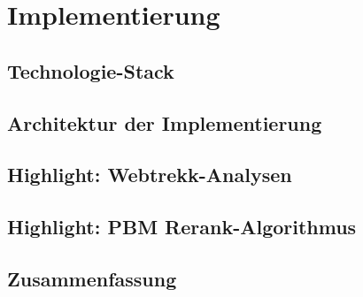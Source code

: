 %
\chapter{Implementierung}
\label{sec:Implementierung}

\section{Technologie-Stack}
\label{sec:Implementierung:Technologie-Stack}

\section{Architektur der Implementierung}
\label{sec:Implementierung:Architektur}

\section{Highlight: Webtrekk-Analysen}
\label{sec:Implementierung:Webtrekk}

\section{Highlight: PBM Rerank-Algorithmus}
\label{sec:Implementierung:PBM}

\section{Zusammenfassung}
\label{sec:Implementierung:Zusammenfassung}